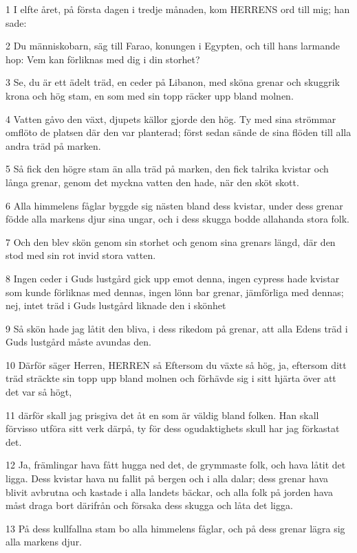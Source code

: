 \par 1 I elfte året, på första dagen i tredje månaden, kom HERRENS ord till mig; han sade:
\par 2 Du människobarn, säg till Farao, konungen i Egypten, och till hans larmande hop: Vem kan förliknas med dig i din storhet?
\par 3 Se, du är ett ädelt träd, en ceder på Libanon, med sköna grenar och skuggrik krona och hög stam, en som med sin topp räcker upp bland molnen.
\par 4 Vatten gåvo den växt, djupets källor gjorde den hög. Ty med sina strömmar omflöto de platsen där den var planterad; först sedan sände de sina flöden till alla andra träd på marken.
\par 5 Så fick den högre stam än alla träd på marken, den fick talrika kvistar och långa grenar, genom det myckna vatten den hade, när den sköt skott.
\par 6 Alla himmelens fåglar byggde sig nästen bland dess kvistar, under dess grenar födde alla markens djur sina ungar, och i dess skugga bodde allahanda stora folk.
\par 7 Och den blev skön genom sin storhet och genom sina grenars längd, där den stod med sin rot invid stora vatten.
\par 8 Ingen ceder i Guds lustgård gick upp emot denna, ingen cypress hade kvistar som kunde förliknas med dennas, ingen lönn bar grenar, jämförliga med dennas; nej, intet träd i Guds lustgård liknade den i skönhet
\par 9 Så skön hade jag låtit den bliva, i dess rikedom på grenar, att alla Edens träd i Guds lustgård måste avundas den.
\par 10 Därför säger Herren, HERREN så Eftersom du växte så hög, ja, eftersom ditt träd sträckte sin topp upp bland molnen och förhävde sig i sitt hjärta över att det var så högt,
\par 11 därför skall jag prisgiva det åt en som är väldig bland folken. Han skall förvisso utföra sitt verk därpå, ty för dess ogudaktighets skull har jag förkastat det.
\par 12 Ja, främlingar hava fått hugga ned det, de grymmaste folk, och hava låtit det ligga. Dess kvistar hava nu fallit på bergen och i alla dalar; dess grenar hava blivit avbrutna och kastade i alla landets bäckar, och alla folk på jorden hava måst draga bort därifrån och försaka dess skugga och låta det ligga.
\par 13 På dess kullfallna stam bo alla himmelens fåglar, och på dess grenar lägra sig alla markens djur.
